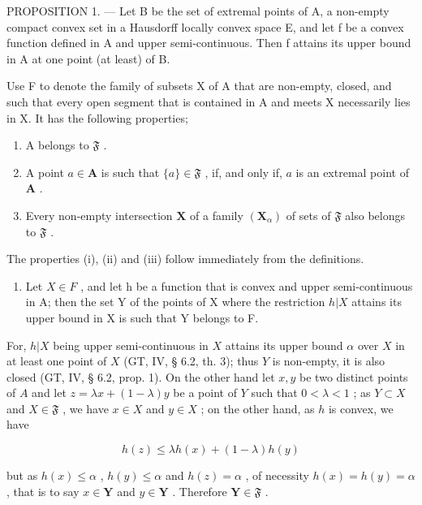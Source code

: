 PROPOSITION 1. --- Let B be the set of extremal points of A, a non-empty compact convex set in a Hausdorff locally convex space E, and let f be a convex function defined in A and upper semi-continuous. Then f attains its upper bound in A at one point (at least) of B.

Use F to denote the family of subsets X of A that are non-empty, closed, and such that every open segment that is contained in A and meets X necessarily lies in X. It has the following properties;

\begin{enumerate}
\def\labelenumi{(\roman{enumi})}
\item
  A belongs to \(\mathfrak{F}\) .
\item
  A point \(a \in \mathbf{A}\) is such that \(\{a\} \in \mathfrak{F}\) , if, and only if, \(a\) is an extremal point of \(\mathbf{A}\) .
\item
  Every non-empty intersection \(\mathbf{X}\) of a family \((\mathbf{X}_{\alpha})\) of sets of \(\mathfrak{F}\) also belongs to \(\mathfrak{F}\) .
\end{enumerate}

The properties (i), (ii) and (iii) follow immediately from the definitions.

\begin{enumerate}
\def\labelenumi{(\roman{enumi})}
\setcounter{enumi}{3}
\tightlist
\item
  Let \(X \in F\) , and let h be a function that is convex and upper semi-continuous in A; then the set Y of the points of X where the restriction \(h|X\) attains its upper bound in X is such that Y belongs to F.
\end{enumerate}

For, \(h|X\) being upper semi-continuous in \(X\) attains its upper bound \(\alpha\) over \(X\) in at least one point of \(X\) (GT, IV, § 6.2, th. 3); thus \(Y\) is non-empty, it is also closed (GT, IV, § 6.2, prop. 1). On the other hand let \(x, y\) be two distinct points of \(A\) and let \(z = \lambda x + (1 - \lambda)y\) be a point of \(Y\) such that \(0 < \lambda < 1\) ; as \(Y \subset X\) and \(X \in \mathfrak{F}\) , we have \(x \in X\) and \(y \in X\) ; on the other hand, as \(h\) is convex, we have

\[
h (z) \leqslant \lambda h (x) + (1 - \lambda) h (y)
\]

but as \(h(x) \leqslant \alpha\) , \(h(y) \leqslant \alpha\) and \(h(z) = \alpha\) , of necessity \(h(x) = h(y) = \alpha\) , that is to say \(x \in \mathbf{Y}\) and \(y \in \mathbf{Y}\) . Therefore \(\mathbf{Y} \in \mathfrak{F}\) .

